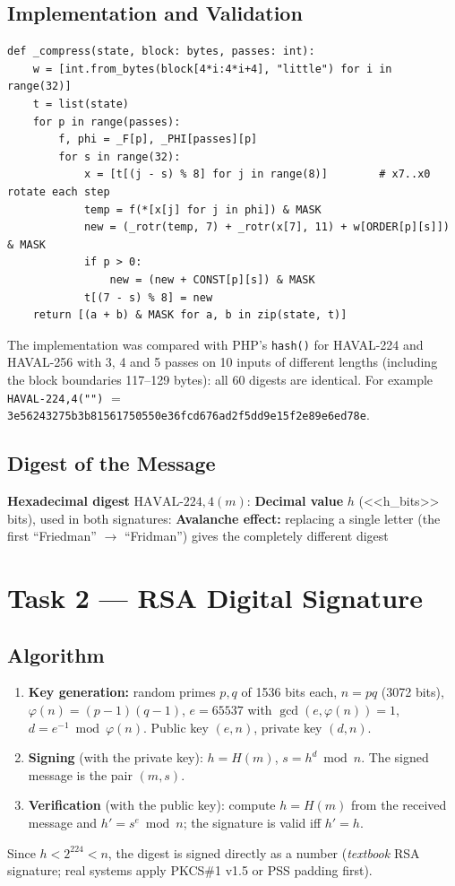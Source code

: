 \documentclass[12pt,a4paper]{article}
\begin{document}
\subsection{Implementation and Validation}
\begin{lstlisting}[style=py, caption={Compression function of HAVAL (\texttt{haval.py}, excerpt)}]
def _compress(state, block: bytes, passes: int):
    w = [int.from_bytes(block[4*i:4*i+4], "little") for i in range(32)]
    t = list(state)
    for p in range(passes):
        f, phi = _F[p], _PHI[passes][p]
        for s in range(32):
            x = [t[(j - s) % 8] for j in range(8)]        # x7..x0 rotate each step
            temp = f(*[x[j] for j in phi]) & MASK
            new = (_rotr(temp, 7) + _rotr(x[7], 11) + w[ORDER[p][s]]) & MASK
            if p > 0:
                new = (new + CONST[p][s]) & MASK
            t[(7 - s) % 8] = new
    return [(a + b) & MASK for a, b in zip(state, t)]
\end{lstlisting}
The implementation was compared with PHP's \texttt{hash()} for HAVAL-224 and HAVAL-256 with 3,
4 and 5 passes on 10 inputs of different lengths (including the block boundaries 117–129 bytes):
all 60 digests are identical. For example
\texttt{HAVAL-224,4("")} $=$ \texttt{3e56243275b3b81561750550e36fcd676ad2f5dd9e15f2e89e6ed78e}.

\subsection{Digest of the Message}
\noindent\textbf{Hexadecimal digest} $\mathrm{HAVAL\text{-}224,4}(m)$:
\noindent\textbf{Decimal value} $h$ (<<h_bits>> bits), used in both signatures:
\textbf{Avalanche effect:} replacing a single letter (the first ``Friedman'' $\to$ ``Fridman'')
gives the completely different digest

\section{Task 2 — RSA Digital Signature}
\subsection{Algorithm}
\begin{enumerate}
  \item \textbf{Key generation:} random primes $p, q$ of 1536 bits each, $n = pq$ (3072 bits),
        $\varphi(n) = (p-1)(q-1)$, $e = 65537$ with $\gcd(e,\varphi(n)) = 1$,
        $d = e^{-1} \bmod \varphi(n)$. Public key $(e,n)$, private key $(d,n)$.
  \item \textbf{Signing} (with the private key): $h = H(m)$, \quad $s = h^{d} \bmod n$.
        The signed message is the pair $(m, s)$.
  \item \textbf{Verification} (with the public key): compute $h = H(m)$ from the received message
        and $h' = s^{e} \bmod n$; the signature is valid iff $h' = h$.
\end{enumerate}
Since $h < 2^{224} < n$, the digest is signed directly as a number (\emph{textbook} RSA signature;
real systems apply PKCS\#1 v1.5 or PSS padding first).
\end{document}
